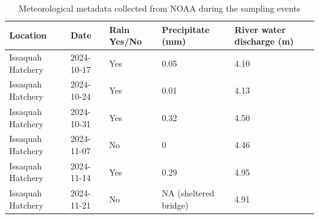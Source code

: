 \documentclass{article}
\begin{document}
\begin{table}
    \centering
    \begin{tabular}{lllll}
    \textbf{Location}         & \textbf{Date}     & \textbf{Rain Yes/No} & \textbf{Precipitate (mm)}       & \textbf{River water discharge (m)}\\
\hline
Issaquah Hatchery & 2024-10-17 & Yes        & 0.05                  & 4.10 \\
Issaquah Hatchery & 2024-10-24 & Yes        & 0.01                  & 4.13 \\
Issaquah Hatchery & 2024-10-31 & Yes        & 0.32                  & 4.50 \\
Issaquah Hatchery & 2024-11-07 & No         & 0                     & 4.46 \\
Issaquah Hatchery & 2024-11-14 & Yes        & 0.29                  & 4.95 \\
Issaquah Hatchery & 2024-11-21 & No         & NA (sheltered bridge) & 4.91 \\
\hline
\end{tabular}
\caption{Meteorological metadata collected from NOAA during the sampling events}
\end{table}
\end{document}
